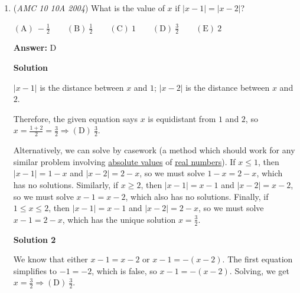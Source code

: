 \begin{enumerate}
 \textbf{Answer: }E



\textbf{Solution}

$20$ dollars is the same as $2000$ cents, and $1.45\%$ of $2000$ is $0.0145\times2000=29$ cents. $\Rightarrow\boxed{\mathrm{(E)}\ 29}$.

 \textbf{Alternate Solution} Since there can't be decimal values of cents, the answer must be $\Rightarrow\boxed{\mathrm{(E)}\ 29}$. 

 Education, the Study of Everything

 


	\item (\textit{AMC 10 10A 2004}) What is the value of $x$ if $|x-1|=|x-2|$?


 $\mathrm{(A) \ } -\frac12 \qquad \mathrm{(B) \ } \frac12 \qquad \mathrm{(C) \ } 1 \qquad \mathrm{(D) \ } \frac32 \qquad \mathrm{(E) \ } 2$

 \textbf{Answer: }D



\textbf{Solution}

$|x-1|$ is the distance between $x$ and $1$; $|x-2|$ is the distance between $x$ and $2$.

 Therefore, the given equation says $x$ is equidistant from $1$ and $2$, so $x=\frac{1+2}2=\frac{3}{2}\Rightarrow\boxed{\mathrm{(D)}\ \frac{3}{2}}$.

 Alternatively, we can solve by casework (a method which should work for any similar problem involving \href{https://artofproblemsolving.com/wiki/index.php?title=Absolute\_value}{absolute values} of \href{https://artofproblemsolving.com/wiki/index.php?title=Real\_number}{real numbers}).  If $x \leq 1$, then $|x - 1| = 1-x$ and $|x - 2| = 2 - x$, so we must solve $1 - x = 2 - x$, which has no solutions.  Similarly, if $x \geq 2$, then $|x - 1| = x - 1$ and $|x - 2| = x - 2$, so we must solve $x - 1 = x- 2$, which also has no solutions.  Finally, if $1 \leq x \leq 2$, then $|x - 1| = x - 1$ and $|x - 2| = 2-x$, so we must solve $x - 1 = 2 - x$, which has the unique solution $x = \frac32$.

 



\textbf{Solution 2}

We know that either $x-1=x-2$ or $x-1=-(x-2)$. The first equation simplifies to $-1=-2$, which is false, so $x-1=-(x-2)$. Solving, we get $x=\frac{3}{2}\Rightarrow\boxed{\mathrm{(D)}\ \frac{3}{2}}$.

 




\end{enumerate}
